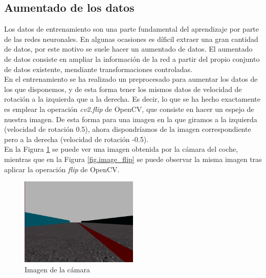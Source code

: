 \subsection{Aumentado de los datos}

Los datos de entrenamiento son una parte fundamental del aprendizaje por parte de las redes neuronales. En algunas ocasiones es díficil extraer una gran cantidad de datos, por este motivo se suele hacer un aumentado de datos. El aumentado de datos consiste en ampliar la información de la red a partir del propio conjunto de datos existente, mendiante transformaciones controladas.\\

En el entrenamiento se ha realizado un preprocesado para aumentar los datos de los que disponemos, y de esta forma tener los mismos datos de velocidad de rotación a la izquierda que a la derecha. Es decir, lo que se ha hecho exactamente es emplear la operación \textit{cv2.flip} de OpenCV, que consiste en hacer un espejo de nuestra imagen. De esta forma para una imagen en la que giramos a la izquierda (velocidad de rotación 0.5), ahora dispondríamos de la imagen correspondiente pero a la derecha (velocidad de rotación -0.5).\\

En la Figura \ref{fig.image_camera} se puede ver una imagen obtenida por la cámara del coche, mientras que en la Figura \ref{fig.image_flip} se puede observar la misma imagen tras aplicar la operación \textit{flip} de OpenCV.\\


\begin{figure}[H]
\begin{center}
	\includegraphics[width=0.5\textwidth]{figures/Regresion/img_normal.png}
   \caption{Imagen de la cámara}
	\label{fig.image_camera}
\end{center}
\end{figure}

